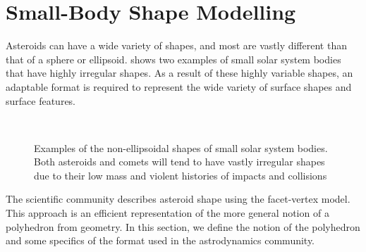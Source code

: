 \section{Small-Body Shape Modelling}

Asteroids can have a wide variety of shapes, and most are vastly different than that of a sphere or ellipsoid.
 shows two examples of small solar system bodies that have highly irregular shapes.
As a result of these highly variable shapes, an adaptable format is required to represent the wide variety of surface shapes and surface features.
\begin{figure}[h]
    \centering
    ~
    \caption{Examples of the non-ellipsoidal shapes of small solar system bodies. Both asteroids and comets will tend to have vastly irregular shapes due to their low mass and violent histories of impacts and collisions~\label{fig:irregular_asteroids}}
\end{figure}
The scientific community describes asteroid shape using the facet-vertex model.
This approach is an efficient representation of the more general notion of a polyhedron from geometry.
In this section, we define the notion of the polyhedron and some specifics of the format used in the astrodynamics community.

